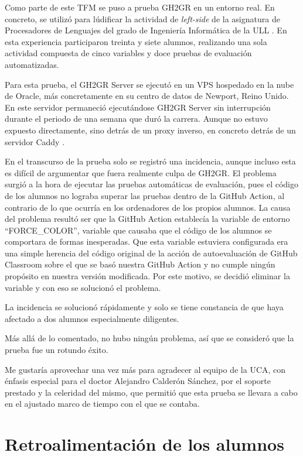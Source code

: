 Como parte de este \acrshort{TFM} se puso a prueba GH2GR en un entorno real. En concreto, se utilizó para lúdificar la actividad de \textit{left-side} de la asignatura de Procesadores de Lenguajes del grado de Ingeniería Informática de la \acrshort{ULL} \cite{ullplNextraNext}. En esta experiencia participaron treinta y siete alumnos, realizando una sola actividad compuesta de cinco variables y doce pruebas de evaluación automatizadas.

Para esta prueba, el GH2GR Server se ejecutó en un \acrshort{VPS} hospedado en la nube de Oracle, más concretamente en su centro de datos de Newport, Reino Unido. En este servidor permaneció ejecutándose GH2GR Server sin interrupción durante el periodo de una semana que duró la carrera. Aunque no estuvo expuesto directamente, sino detrás de un proxy inverso, en concreto detrás de un servidor Caddy \cite{caddyserverWelcomeCaddy}.

En el transcurso de la prueba solo se registró una incidencia, aunque incluso esta es difícil de argumentar que fuera realmente culpa de GH2GR. El problema surgió a la hora de ejecutar las pruebas automáticas de evaluación, pues el código de los alumnos no lograba superar las pruebas dentro de la GitHub Action, al contrario de lo que ocurría en los ordenadores de los propios alumnos. La causa del problema resultó ser que la GitHub Action establecía la variable de entorno ``FORCE\_COLOR'', variable que causaba que el código de los alumnos se comportara de formas inesperadas. Que esta variable estuviera configurada era una simple herencia del código original de la acción de autoevaluación de GitHub Classroom sobre el que se basó nuestra GitHub Action y no cumple ningún propósito en nuestra versión modificada. Por este motivo, se decidió eliminar la variable y con eso se solucionó el problema.

La incidencia se solucionó rápidamente y solo se tiene constancia de que haya afectado a dos alumnos especialmente diligentes.

Más allá de lo comentado, no hubo ningún problema, así que se consideró que la prueba fue un rotundo éxito.

Me gustaría aprovechar una vez más para agradecer al equipo de la \acrshort{UCA}, con énfasis especial para el doctor Alejandro Calderón Sánchez, por el soporte prestado y la celeridad del mismo, que permitió que esta prueba se llevara a cabo en el ajustado marco de tiempo con el que se contaba.


\section{Retroalimentación de los alumnos}

